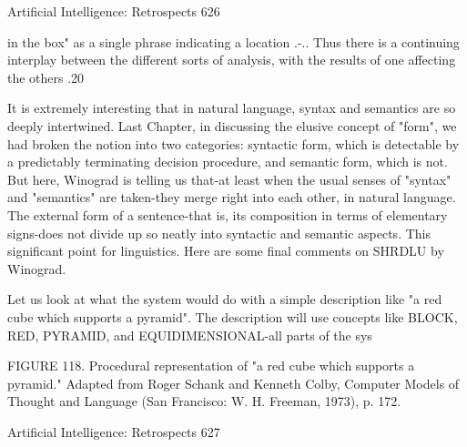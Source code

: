 {Artificial Intelligence: Retrospects                                                   626

   in the box" as a single phrase indicating a location .-.. Thus there is a continuing
   interplay between the different sorts of analysis, with the results of one affecting
   the others .20

        It is extremely interesting that in natural language, syntax and semantics are so
deeply intertwined. Last Chapter, in discussing the elusive concept of "form", we had
broken the notion into two categories: syntactic form, which is detectable by a
predictably terminating decision procedure, and semantic form, which is not. But here,
Winograd is telling us that-at least when the usual senses of "syntax" and "semantics" are
taken-they merge right into each other, in natural language. The external form of a
sentence-that is, its composition in terms of elementary signs-does not divide up so neatly
into syntactic and semantic aspects. This significant point for linguistics.
        Here are some final comments on SHRDLU by Winograd.

Let us look at what the system would do with a simple description like "a red cube which
supports a pyramid". The description will use concepts like BLOCK, RED, PYRAMID,
and EQUIDIMENSIONAL-all parts of the sys

FIGURE 118. Procedural representation of "a red cube which supports a pyramid."
Adapted from Roger Schank and Kenneth Colby, Computer Models of Thought and
Language (San Francisco: W. H. Freeman, 1973), p. 172.




Artificial Intelligence: Retrospects                                                   627

}

